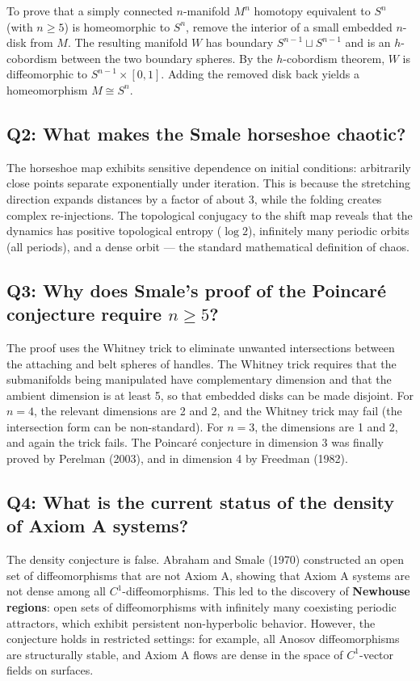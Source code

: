 To prove that a simply connected \(n\)-manifold \(M^n\) homotopy equivalent to \(S^n\) (with \(n \geq 5\)) is homeomorphic to \(S^n\), remove the interior of a small embedded \(n\)-disk from \(M\). The resulting manifold \(W\) has boundary \(S^{n-1} \sqcup S^{n-1}\) and is an \(h\)-cobordism between the two boundary spheres. By the \(h\)-cobordism theorem, \(W\) is diffeomorphic to \(S^{n-1} \times [0,1]\). Adding the removed disk back yields a homeomorphism \(M \cong S^n\).

\subsection*{Q2: What makes the Smale horseshoe chaotic?}

The horseshoe map exhibits sensitive dependence on initial conditions: arbitrarily close points separate exponentially under iteration. This is because the stretching direction expands distances by a factor of about 3, while the folding creates complex re-injections. The topological conjugacy to the shift map reveals that the dynamics has positive topological entropy (\(\log 2\)), infinitely many periodic orbits (all periods), and a dense orbit --- the standard mathematical definition of chaos.

\subsection*{Q3: Why does Smale's proof of the Poincar\'e conjecture require \(n \geq 5\)?}

The proof uses the Whitney trick to eliminate unwanted intersections between the attaching and belt spheres of handles. The Whitney trick requires that the submanifolds being manipulated have complementary dimension and that the ambient dimension is at least 5, so that embedded disks can be made disjoint. For \(n = 4\), the relevant dimensions are 2 and 2, and the Whitney trick may fail (the intersection form can be non-standard). For \(n = 3\), the dimensions are 1 and 2, and again the trick fails. The Poincar\'e conjecture in dimension 3 was finally proved by Perelman (2003), and in dimension 4 by Freedman (1982).

\subsection*{Q4: What is the current status of the density of Axiom A systems?}

The density conjecture is false. Abraham and Smale (1970) constructed an open set of diffeomorphisms that are not Axiom A, showing that Axiom A systems are not dense among all \(C^1\)-diffeomorphisms. This led to the discovery of \textbf{Newhouse regions}: open sets of diffeomorphisms with infinitely many coexisting periodic attractors, which exhibit persistent non-hyperbolic behavior. However, the conjecture holds in restricted settings: for example, all Anosov diffeomorphisms are structurally stable, and Axiom A flows are dense in the space of \(C^1\)-vector fields on surfaces.

